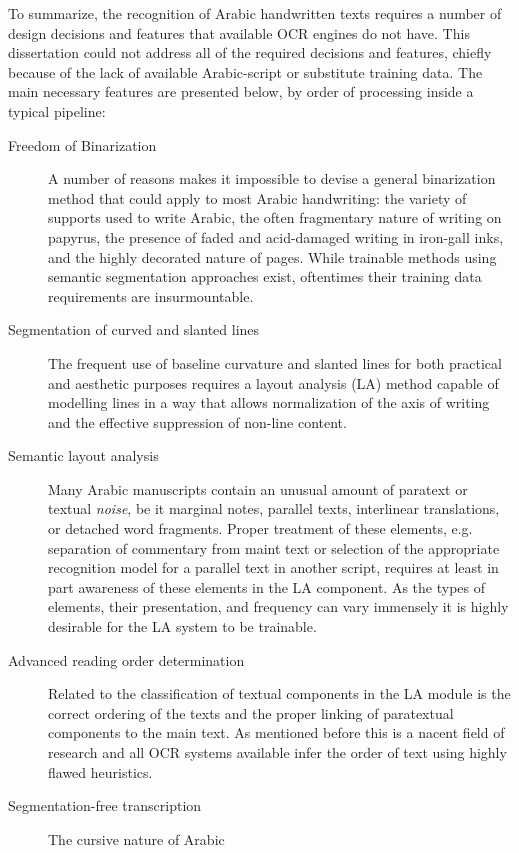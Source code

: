 To summarize, the recognition of Arabic handwritten texts requires a number of
design decisions and features that available OCR engines do not have. This
dissertation could not address all of the required decisions and features,
chiefly because of the lack of available Arabic-script or substitute training
data. The main necessary features are presented below, by order of processing
inside a typical pipeline: 

\begin{description}
	\item[Freedom of Binarization] A number of reasons makes it impossible
		to devise a general binarization method that could apply to
		most Arabic handwriting: the variety of supports used to write
		Arabic, the often fragmentary nature of writing on papyrus, the
		presence of faded and acid-damaged writing in iron-gall inks,
		and the highly decorated nature of pages. While trainable
		methods using semantic segmentation approaches exist,
		oftentimes their training data requirements are insurmountable.
	\item[Segmentation of curved and slanted lines] The frequent use of
		baseline curvature and slanted lines for both practical and
		aesthetic purposes requires a layout analysis (LA) method
		capable of modelling lines in a way that allows normalization
		of the axis of writing and the effective suppression of
		non-line content.
	\item[Semantic layout analysis] Many Arabic manuscripts contain an
		unusual amount of paratext or textual \emph{noise}, be it
		marginal notes, parallel texts, interlinear translations, or
		detached word fragments. Proper treatment of these elements,
		e.g. separation of commentary from maint text or selection of
		the appropriate recognition model for a parallel text in
		another script, requires at least in part awareness of these
		elements in the LA component. As the types of elements, their
		presentation, and frequency can vary immensely it is highly
		desirable for the LA system to be trainable.
	\item[Advanced reading order determination] Related to the
		classification of textual components in the LA module is the
		correct ordering of the texts and the proper linking of
		paratextual components to the main text. As mentioned before
		this is a nacent field of research and all OCR systems
		available infer the order of text using highly flawed
		heuristics.
	\item[Segmentation-free transcription] The cursive nature of Arabic

\end{description}
